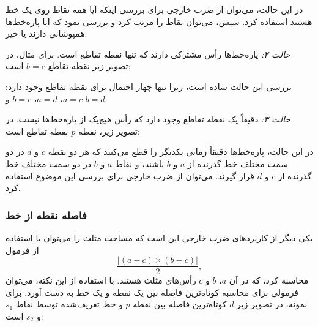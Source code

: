 در این حالت، می‌توان از ضرب خارجی برای بررسی اینکه آیا همه نقاط روی یک خط هستند استفاده کرد.
سپس، می‌توان نقاط را مرتب کرد و بررسی نمود که آیا پاره‌خط‌ها همپوشانی دارند یا خیر.

\textit{حالت ۲:}
پاره‌خط‌ها رأس مشترکی دارند
که تنها نقطه تقاطع است.
برای مثال، در تصویر زیر نقطه تقاطع $b=c$ است:

\begin{center}
\end{center}

بررسی این حالت ساده است، زیرا
تنها چهار احتمال برای نقطه تقاطع وجود دارد:
$a=c$، $a=d$، $b=c$ و $b=d$.

\textit{حالت ۳:}
دقیقاً یک نقطه تقاطع وجود دارد
که رأس هیچ‌یک از پاره‌خط‌ها نیست.
در تصویر زیر، نقطه $p$ نقطه تقاطع است:
\begin{center}
\end{center}

در این حالت، پاره‌خط‌ها دقیقاً زمانی یکدیگر را قطع می‌کنند
که هر دو نقطه $c$ و $d$ در دو سمت مختلف خط گذرنده از $a$ و $b$ باشند،
و نقاط $a$ و $b$ در دو سمت مختلف خط گذرنده از $c$ و $d$ قرار گیرند.
می‌توان از ضرب خارجی برای بررسی این موضوع استفاده کرد.

\subsubsection{فاصله نقطه از خط}

یکی دیگر از کاربردهای ضرب خارجی این است که
مساحت مثلث را می‌توان با استفاده از فرمول
\[\frac{| (a-c) \times (b-c) |}{2},\]
محاسبه کرد، که در آن $a$، $b$ و $c$ رأس‌های مثلث هستند.
با استفاده از این نکته، می‌توان فرمولی برای محاسبه کوتاه‌ترین فاصله بین یک نقطه و یک خط به دست آورد.
برای نمونه، در تصویر زیر $d$ کوتاه‌ترین فاصله بین نقطه $p$ و خط تعریف‌شده توسط نقاط $s_1$ و $s_2$ است:
\begin{center}
\end{center}

